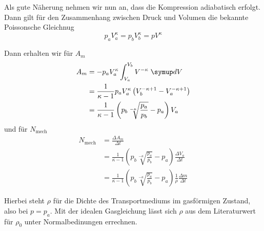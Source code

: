Als gute N\"aherung nehmen wir nun an, dass die Kompression adiabatisch erfolgt. Dann gilt 
f\"ur den Zusammenhang zwischen Druck und Volumen die bekannte Poissonsche Gleichnug
\begin{equation}
	p_a V_a^\kappa = p_b V_b^\kappa = p V^\kappa
	\label{eqn:poissonsche_Gleichung}
\end{equation}

Dann erhalten wir f\"ur $A_m$
\begin{align}
	A_m 
	&= -p_a V_a^\kappa \int_{V_a}^{V_b} V^{-\kappa} \; \symup dV
	\\
	&= \frac{1}{\kappa - 1} p_a V_a^\kappa \left(V_b^{-\kappa+1} - V_a^{-\kappa +1} \right)
	\\
	&= \frac{1}{\kappa - 1} \left( p_b \sqrt[-\kappa]{\frac{p_a}{p_b}} - p_a \right) V_a
	\label{eqn:a_m}
\end{align}
und f\"ur $N_\text{mech}$
\begin{align}
	N_\text{mech}
	&= \frac{\Delta A_m}{\Delta t}
	\\
	&= \frac{1}{\kappa - 1}  \left( p_b \sqrt[-\kappa]{\frac{p_a}{p_b}} - p_a \right) 
	\frac{\Delta V_a}{\Delta t}
	\\
	&=  \frac{1}{\kappa - 1}  \left( p_b \sqrt[-\kappa]{\frac{p_a}{p_b}} - p_a \right)
	\frac{1}{\rho} \frac{\Delta m}{\Delta t}
	\label{eqn:kompressorleistung}
\end{align}

Hierbei steht $\rho$ f\"ur die Dichte des Transportmediums im gasf\"ormigen Zustand, also 
bei $p = p_a$. Mit der idealen Gasgleichung l\"asst sich $\rho$ aus dem Literaturwert f\"ur
$\rho_0$ unter Normalbedinungen errechnen.

